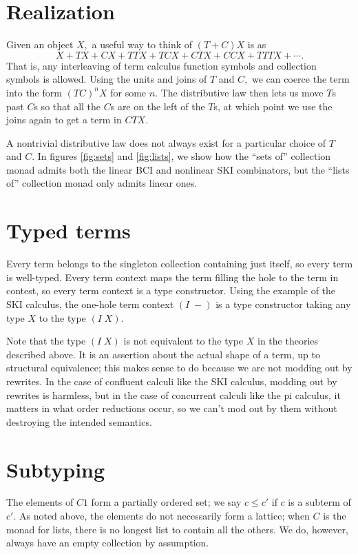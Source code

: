 \documentclass[sigplan,9pt,review,anonymous]{acmart}\settopmatter{printfolios=true,printccs=false,printacmref=false}
\begin{document}
\section{Realization}

Given an object $X,$ a useful way to think of $(T+C)X$ is as
\[X + TX + CX + TTX + TCX + CTX + CCX + TTTX + \cdots.\]
That is, any interleaving of term calculus function symbols and collection symbols is allowed. Using the units and joins of $T$ and $C,$ we can coerce the term into the form $(TC)^nX$ for some $n.$  The distributive law then lets us move $T$s past $C$s so that all the $C$s are on the left of the $T$s, at which point we use the joins again to get a term in $CTX.$

A nontrivial distributive law does not always exist for a particular choice of $T$ and $C.$  In figures \ref{fig:sets} and \ref{fig:lists}, we show how the ``sets of'' collection monad admits both the linear BCI and nonlinear SKI combinators, but the ``lists of'' collection monad only admits linear ones.

\section{Typed terms}

Every term belongs to the singleton collection containing just itself, so every term is well-typed.  Every term context maps the term filling the hole to the term in contest, so every term context is a type constructor.  Using the example of the SKI calculus, the one-hole term context $(I\; -)$ is a type constructor taking any type $X$ to the type $(I\;X).$  

Note that the type $(I\;X)$ is not equivalent to the type $X$ in the theories described above.  It is an assertion about the actual shape of a term, up to structural equivalence; this makes sense to do because we are not modding out by rewrites.  In the case of confluent calculi like the SKI calculus, modding out by rewrites is harmless, but in the case of concurrent calculi like the pi calculus, it matters in what order reductions occur, so we can't mod out by them without destroying the intended semantics.

\section{Subtyping}

The elements of $C1$ form a partially ordered set; we say $c \le c'$ if $c$ is a subterm of $c'.$  As noted above, the elements do not necessarily form a lattice; when $C$ is the monad for lists, there is no longest list to contain all the others.  We do, however, always have an empty collection by assumption.
\end{document}
